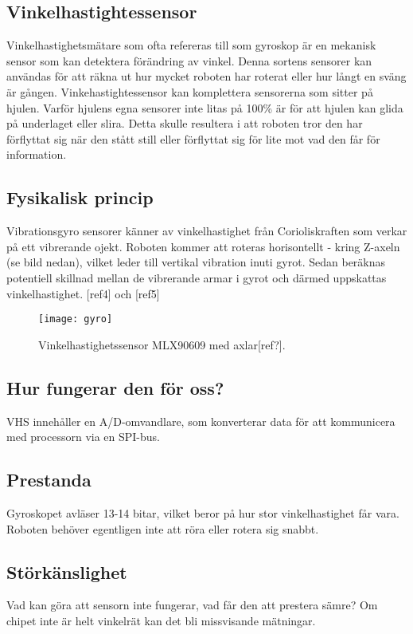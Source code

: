 \documentclass[11pt]{article}
\begin{document}
\begin{flushleft}
 \section{Vinkelhastightessensor}
 Vinkelhastighetsmätare som ofta refereras till som gyroskop är en mekanisk sensor som kan detektera förändring av vinkel. Denna sortens sensorer kan användas för att räkna ut hur mycket roboten har roterat eller hur långt en sväng är gången. Vinkehastightessensor kan komplettera sensorerna som sitter på hjulen. Varför hjulens egna sensorer inte litas på 100\% är för att hjulen kan glida på underlaget eller slira. Detta skulle resultera i att roboten tror den har förflyttat sig när den stått still eller förflyttat sig för lite mot vad den får för information.
 
 \pagebreak
 
 \subsection{Fysikalisk princip}
 Vibrationsgyro sensorer känner av vinkelhastighet från Corioliskraften som verkar på ett vibrerande ojekt. Roboten kommer att roteras horisontellt - kring Z-axeln (se bild nedan), vilket leder till vertikal vibration inuti gyrot. Sedan beräknas potentiell skillnad mellan de vibrerande armar i gyrot och därmed uppskattas vinkelhastighet. [ref4] och [ref5]
 
\begin{figure}[H]
\centering
\texttt{[image: gyro]}
\caption{Vinkelhastighetssensor MLX90609 med axlar[ref?].}
\label{fig:gyro}
\end{figure}
 
 \subsection{Hur fungerar den för oss?}
 VHS innehåller en A/D-omvandlare, som konverterar data för att kommunicera med processorn via en SPI-bus.
 
 \subsection{Prestanda}
 Gyroskopet avläser 13-14 bitar, vilket beror på hur stor vinkelhastighet får vara. Roboten behöver egentligen inte att röra eller rotera sig snabbt. 

 \subsection{Störkänslighet}
 Vad kan göra att sensorn inte fungerar, vad får den att prestera sämre? Om chipet inte är helt vinkelrät kan det bli missvisande mätningar.
 

\end{flushleft}
\end{document}
